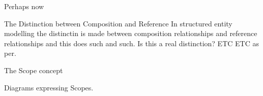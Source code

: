 Perhaps now

The Distinction between Composition and Reference
In structured entity modelling the distinctin is made between composition relationships and reference relationships and this does such and such. Is this a real distinction? ETC ETC as per.

The Scope concept

Diagrams expressing Scopes.

